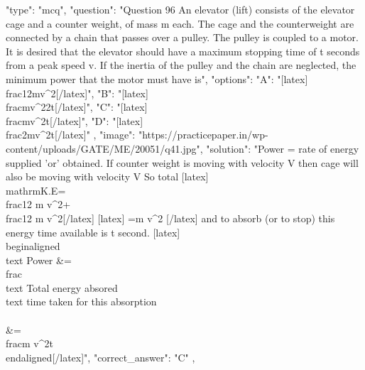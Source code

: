   {
    "type": "mcq",
    "question": "Question 96 An elevator (lift) consists of the elevator cage and a counter weight, of mass m each. The cage and the counterweight are connected by a chain that passes over a pulley. The pulley is coupled to a motor. It is desired that the elevator should have a maximum stopping time of t seconds from a peak speed v. If the inertia of the pulley and the chain are neglected, the minimum power that the motor must have is",
    "options": {
      "A": "[latex]\\frac{1}{2}mv^{2}[/latex]",
      "B": "[latex]\\frac{mv^{2}}{2t}[/latex]",
      "C": "[latex]\\frac{mv^{2}}{t}[/latex]",
      "D": "[latex]\\frac{2mv^{2}}{t}[/latex]"
    },
    "image": "https://practicepaper.in/wp-content/uploads/GATE/ME/20051/q41.jpg",
    "solution": "Power = rate of energy supplied 'or' obtained. If counter weight is moving with velocity V then cage will also be moving with velocity V So total [latex] \\mathrm{K.E}=\\frac{1}{2} m v^{2}+\\frac{1}{2} m v^{2}[/latex] [latex] =m v^{2} [/latex] and to absorb (or to stop) this energy time available is t second. [latex] \\begin{aligned} \\text { Power } &=\\frac{\\text { Total energy absored }}{\\text { time taken for this absorption }} \\\\ &=\\frac{m v^{2}}{t} \\end{aligned}[/latex]",
    "correct_answer": "C"
  },
